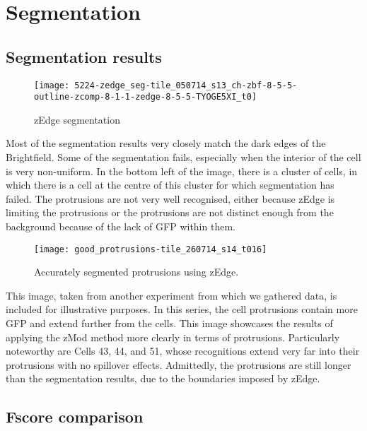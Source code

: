\section{Segmentation}

\subsection{Segmentation results}

\begin{figure}[htbp!]
\centering
\texttt{[image: 5224-zedge\_seg-tile\_050714\_s13\_ch-zbf-8-5-5-outline-zcomp-8-1-1-zedge-8-5-5-TYOGE5XI\_t0]}
\caption{zEdge segmentation}
\label{fig:zedge_segmentation}
\end{figure}

Most of the segmentation results very closely match the dark edges of the Brightfield. Some of the segmentation fails, especially when the interior of the cell is very non-uniform. In the bottom left of the image, there is a cluster of cells, in which there is a cell at the centre of this cluster for which segmentation has failed. The protrusions are not very well recognised, either because zEdge is limiting the protrusions or the protrusions are not distinct enough from the background because of the lack of GFP within them.

\begin{figure}[htbp!]
\centering
\texttt{[image: good\_protrusions-tile\_260714\_s14\_t016]}
\caption{Accurately segmented protrusions using zEdge.}
\label{fig:accurate_zedge}
\end{figure}

This image, taken from another experiment from which we gathered data, is included for illustrative purposes. In this series, the cell protrusions contain more GFP and extend further from the cells. This image showcases the results of applying the zMod method more clearly in terms of protrusions. Particularly noteworthy are Cells 43, 44, and 51, whose recognitions extend very far into their protrusions with no spillover effects. Admittedly, the protrusions are still longer than the segmentation results, due to the boundaries imposed by zEdge.

\subsection{Fscore comparison}


